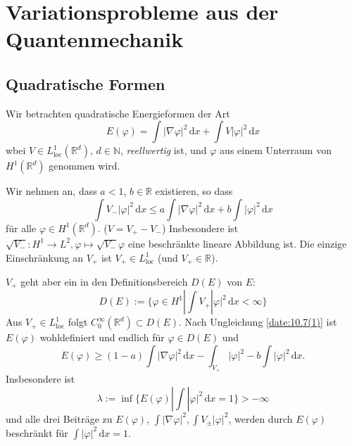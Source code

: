 \documentclass[
paper=a4,
bibtotocnumbered,
liststotocnumbered,
tablecaptionabove,
pointlessnumbers,
twoside,
openright,
10pt
]
{report}
\let\phi\varphi
\theoremstyle{definition}
\numberwithin{equation}{chapter}
\begin{document}
\section{Variationsprobleme aus der Quantenmechanik}
\subsection{Quadratische Formen}
Wir betrachten quadratische Energieformen der Art
\begin{equation}
E(\phi) = \int |\nabla \phi|^2\, \mathrm dx + \int V|\phi|^2\, \mathrm dx
\end{equation}
wbei $V\in L_{\text{loc}}^1(\mathbb R^d)$, $d\in \mathbb N$, \emph{reellwertig} ist, und $\phi$ aus einem Unterraum von $H^1(\mathbb R^d)$ genommen wird. 

Wir nehmen an, dass $a<1$, $b\in \mathbb R$ existieren, so dass 
\begin{equation}\label{date:10.7(1)}
\int V_- |\phi|^2\, \mathrm dx \le a \int |\nabla \phi|^2\, \mathrm dx + b \int |\phi|^2\, \mathrm dx
\end{equation}
für alle $\phi \in H^1(\mathbb R^d)$. ($V= V_+ - V_-$) Insbesondere ist $\sqrt{V_-}: H^1 \to L^2, \phi \mapsto \sqrt{V_-} \phi$ eine beschränkte lineare Abbildung ist.  Die einzige Einschränkung an $V_+$ ist $V_+ \in L^1_{\text{loc}}$ (und $V_+ \in \mathbb R$).

$V_+$ geht aber ein in den Definitionsbereich $D(E)$ von $E$:
\begin{equation}
D(E) := \{ \phi \in H^1| \int V_+ |\phi|^2\, \mathrm dx <\infty\}
\end{equation}
Aus $V_+\in L^1_{\text{loc}}$ folgt $C_0^\infty(\mathbb R^d)\subset D(E)$. Nach Ungleichung \eqref{date:10.7(1)} ist $E(\phi)$ wohldefiniert und endlich für $\phi \in D(E)$ und
\begin{equation}
E(\phi) \ge (1-a) \int |\nabla \phi|^2\, \mathrm dx - \int_{V_+} |\phi|^2- b\int |\phi|^2\, \mathrm dx.
\end{equation}
Insbesondere ist
\begin{equation}
\lambda:= \inf \{ E(\phi) |\int |\phi|^2\, \mathrm dx =1\} >- \infty
\end{equation}
und alle drei Beiträge zu $E(\phi)$, $\int |\nabla \phi|^2, \int V_\pm |\phi|^2$, werden durch $E(\phi)$ beschränkt für $\int |\phi|^2\, \mathrm dx =1$.
\end{document}
